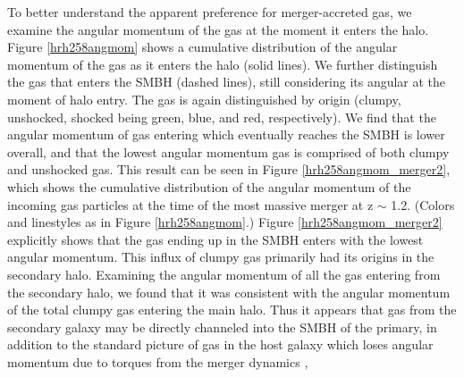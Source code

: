\documentclass[]{emulateapj}
\begin{document}
To better understand the apparent preference for merger-accreted gas, we examine the angular momentum of the gas at the moment it enters the halo. Figure \ref{hrh258angmom} shows a cumulative distribution of the angular momentum of the gas as it enters the halo (solid lines). We further distinguish the gas that enters the SMBH (dashed lines), still considering its angular at the moment of halo entry. The gas is again distinguished by origin (clumpy, unshocked, shocked being green, blue, and red, respectively). We find that the angular momentum of gas entering which eventually reaches the SMBH is lower overall, and that the lowest angular momentum gas is comprised of both clumpy and unshocked gas. This result can be seen in Figure \ref{hrh258angmom_merger2}, which shows the cumulative distribution of the angular momentum of the incoming gas particles at the time of the most massive merger at z $\sim$ 1.2. (Colors and linestyles as in Figure \ref{hrh258angmom}.) Figure \ref{hrh258angmom_merger2} explicitly shows that the gas ending up in the SMBH enters with the lowest angular momentum. This influx of clumpy gas primarily had its origins in the secondary halo. Examining the angular momentum of all the gas entering from the secondary halo, we found that it was consistent with the angular momentum of the total clumpy gas entering the main halo.  Thus it appears that gas from the secondary galaxy may be directly channeled into the SMBH of the primary, in addition to the standard picture of gas in the host galaxy which loses angular momentum due to torques from the merger dynamics \citep{Capelo2015}, 



\end{document}
